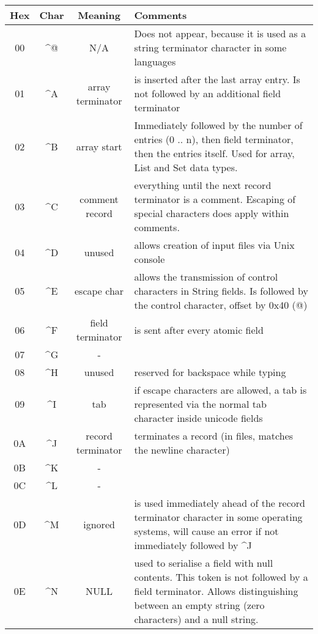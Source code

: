 \documentclass[11pt,a4paper,oneside]{article}
\begin{document}
\begin{tabular}{|c|c|c|p{8cm}|}
\hline
Hex & Char & Meaning & Comments \\
\hline
00 & \textasciicircum {@} & N/A & Does not appear, because it is used as a
string terminator character in some languages \\
01 & \textasciicircum A & array terminator  & is inserted after the last array
entry. Is not followed by an additional field terminator \\
02 & \textasciicircum B & array start       & Immediately followed by the number
of entries (0 .. n), then field terminator, then the entries itself. Used for array, List and Set data types. \\
03 & \textasciicircum C & comment record    & everything until the next
record terminator is a comment. Escaping of special characters does apply within
comments.
\\
04 & \textasciicircum D & unused            & allows creation of input files
via Unix console \\
05 & \textasciicircum E & escape char       & allows the transmission of control
characters in String fields. Is followed by the control character, offset by 0x40 ({@}) \\
06 & \textasciicircum F & field terminator  & is sent after every atomic field
\\
07 & \textasciicircum G &       -            & \\
08 & \textasciicircum H & unused             & reserved for backspace while
typing \\
09 & \textasciicircum I &       tab          & if escape characters are
allowed, a tab is represented via the normal tab character inside unicode
fields \\
0A & \textasciicircum J & record terminator & terminates a record (in files,
matches the newline character) \\
0B & \textasciicircum K &       -            & \\
0C & \textasciicircum L &       -            & \\
0D & \textasciicircum M & ignored           & is used immediately ahead of the record
terminator character in some operating systems, will cause an error if not
immediately followed by \textasciicircum J \\
0E & \textasciicircum N & NULL & used to serialise a field with null contents.
This token is not followed by a field terminator. Allows distinguishing between
an empty string (zero characters) and a null string.\\

\end{tabular}
\end{document}
